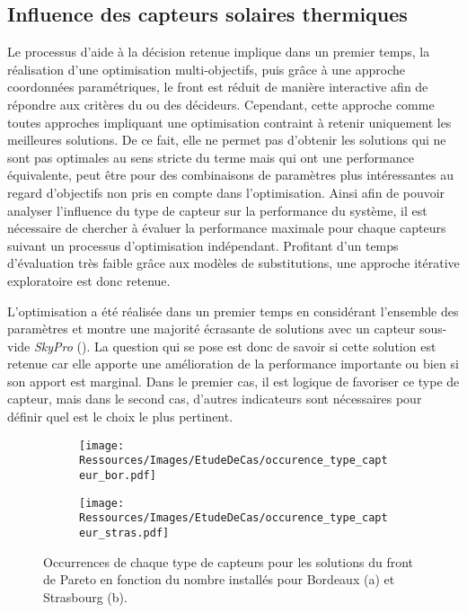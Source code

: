 \subsection{Influence des capteurs solaires thermiques} %
\label{sub:influence_des_capteurs_solaires_thermiques}
Le processus d’aide à la décision retenue implique dans un premier temps, la réalisation
d’une optimisation multi-objectifs, puis grâce à une approche coordonnées paramétriques,
le front est réduit de manière interactive afin de répondre aux critères du ou des
décideurs. Cependant, cette approche comme toutes approches impliquant une optimisation
contraint à retenir uniquement les meilleures solutions. De ce fait, elle ne permet pas
d’obtenir les solutions qui ne sont pas optimales au sens stricte du terme mais qui ont
une performance équivalente, peut être pour des combinaisons de paramètres plus
intéressantes au regard d’objectifs non pris en compte dans l’optimisation. Ainsi afin de
pouvoir analyser l’influence du type de capteur sur la performance du système, il est
nécessaire de chercher à évaluer la performance maximale pour chaque capteurs suivant un
processus d’optimisation indépendant. Profitant d’un temps d’évaluation très faible grâce
aux modèles de substitutions, une approche itérative exploratoire est donc retenue.

L’optimisation a été réalisée dans un premier temps en considérant l’ensemble
des paramètres et montre une majorité écrasante de solutions avec un capteur
sous-vide \textit{SkyPro} (). La question qui se pose
est donc de savoir si cette solution est retenue car elle apporte une amélioration de la
performance importante ou bien si son apport est marginal. Dans le premier cas, il est
logique de favoriser ce type de capteur, mais dans le second cas, d’autres indicateurs
sont nécessaires pour définir quel est le choix le plus pertinent.

\begin{figure}
    \centering
    \begin{subfigure}[b]{0.45\textwidth}
        \centering
        \texttt{[image: Ressources/Images/EtudeDeCas/occurence\_type\_capteur\_bor.pdf]}
        \caption{}
        \label{fig:occurence_type_capteur_bor}
    \end{subfigure}
    \quad
    \begin{subfigure}[b]{0.45\textwidth}
        \centering
        \texttt{[image: Ressources/Images/EtudeDeCas/occurence\_type\_capteur\_stras.pdf]}
        \caption{}
        \label{fig:occurence_type_capteur_stras}
    \end{subfigure}
    \caption[Occurrences de chaque type de capteurs pour les solutions du front de Pareto]
             {Occurrences de chaque type de capteurs pour les solutions du front de Pareto
              en fonction du nombre installés pour Bordeaux (a) et Strasbourg (b).}
    \label{fig:occurence_type_capteur}
\end{figure}

